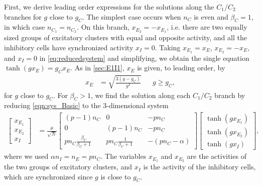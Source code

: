\documentclass[reqno]{siamonline190516}
\begin{document}
First, we derive leading order expressions for the solutions along the $C_1/C_2$ branches for $g$ close to $g_C$. The simplest case occurs when $n_C$ is even and $\beta_C = 1$, in which case $n_{C_1}=n_{C_2}$. On this branch, $x_{E_2} = -x_{E_1}$, i.e. there are two equally sized groups of excitatory clusters with equal and opposite activity, and all the inhibitory cells have synchronized activity $x_I = 0$. Taking $x_{E_1} = x_E$, $x_{E_2} = -x_E$, and $x_I = 0$ in \cref{eq:reducedsystem} and simplifying, we obtain the single equation $\tanh(g x_E) = g_C x_E$. As in \cref{sec:E1I1}, $x_E$ is given, to leading order, by
\begin{align}\label{eq:xEapprox}
x_E &= \sqrt{ \frac{3(g - g_C) }{g^3}} && g \geq g_C,
\end{align}
for $g$ close to $g_C$. For $\beta_C > 1$, we find the solution along each $C_1/C_2$ branch by reducing \cref{eqn:sys_Basic} to the 3-dimensional system
\begin{equation}\label{eq:cluster3system}
 \begin{aligned}
 \begin{bmatrix} x_{E_1} \\ x_{E_2} \\ x_{I} \end{bmatrix} 
 &= \frac{\mu}{\sqrt{N}} 
 \begin{bmatrix} 
    (p-1)n_C & 0 & -p n_C  \\
    0  & (p-1)n_C & -p n_C \\
    p n_C \frac{\beta_C}{\beta_C+1} &
    p n_C \frac{1}{\beta_C+1} &
    -(p n_C - \alpha)
 \end{bmatrix}
 \begin{bmatrix} \tanh(g x_{E_1}) \\\tanh ( g x_{E_2} ) \\\tanh(g x_{I})\end{bmatrix},
 \end{aligned}
 \end{equation}
 where we used $\alpha n_I = n_E = p n_C$. The variables $x_{E_1}$ and $x_{E_2}$ are the activities of the two groups of excitatory clusters, and $x_I$ is the activity of the inhibitory cells, which are synchronized since $g$ is close to $g_C$. 
\end{document}
